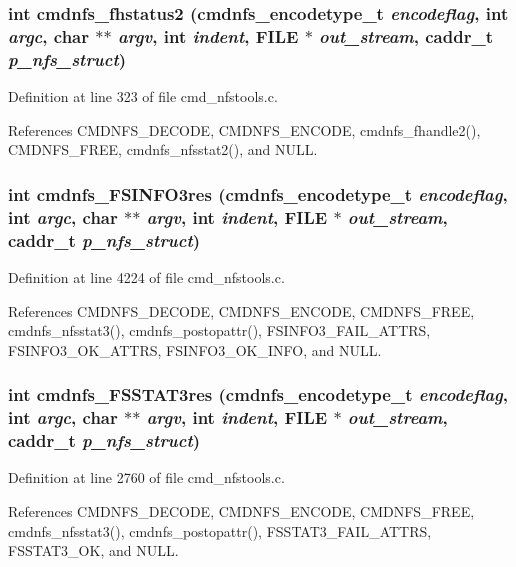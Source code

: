 \subsubsection{\setlength{\rightskip}{0pt plus 5cm}int cmdnfs\_\-fhstatus2 ({\bf cmdnfs\_\-encodetype\_\-t} {\em encodeflag}, int {\em argc}, char $\ast$$\ast$ {\em argv}, int {\em indent}, FILE $\ast$ {\em out\_\-stream}, caddr\_\-t {\em p\_\-nfs\_\-struct})}\label{cmd__nfstools_8h_a17}




Definition at line 323 of file cmd\_\-nfstools.c.

References CMDNFS\_\-DECODE, CMDNFS\_\-ENCODE, cmdnfs\_\-fhandle2(), CMDNFS\_\-FREE, cmdnfs\_\-nfsstat2(), and NULL.
\subsubsection{\setlength{\rightskip}{0pt plus 5cm}int cmdnfs\_\-FSINFO3res ({\bf cmdnfs\_\-encodetype\_\-t} {\em encodeflag}, int {\em argc}, char $\ast$$\ast$ {\em argv}, int {\em indent}, FILE $\ast$ {\em out\_\-stream}, caddr\_\-t {\em p\_\-nfs\_\-struct})}\label{cmd__nfstools_8h_a64}




Definition at line 4224 of file cmd\_\-nfstools.c.

References CMDNFS\_\-DECODE, CMDNFS\_\-ENCODE, CMDNFS\_\-FREE, cmdnfs\_\-nfsstat3(), cmdnfs\_\-postopattr(), FSINFO3\_\-FAIL\_\-ATTRS, FSINFO3\_\-OK\_\-ATTRS, FSINFO3\_\-OK\_\-INFO, and NULL.
\subsubsection{\setlength{\rightskip}{0pt plus 5cm}int cmdnfs\_\-FSSTAT3res ({\bf cmdnfs\_\-encodetype\_\-t} {\em encodeflag}, int {\em argc}, char $\ast$$\ast$ {\em argv}, int {\em indent}, FILE $\ast$ {\em out\_\-stream}, caddr\_\-t {\em p\_\-nfs\_\-struct})}\label{cmd__nfstools_8h_a47}




Definition at line 2760 of file cmd\_\-nfstools.c.

References CMDNFS\_\-DECODE, CMDNFS\_\-ENCODE, CMDNFS\_\-FREE, cmdnfs\_\-nfsstat3(), cmdnfs\_\-postopattr(), FSSTAT3\_\-FAIL\_\-ATTRS, FSSTAT3\_\-OK, and NULL.
